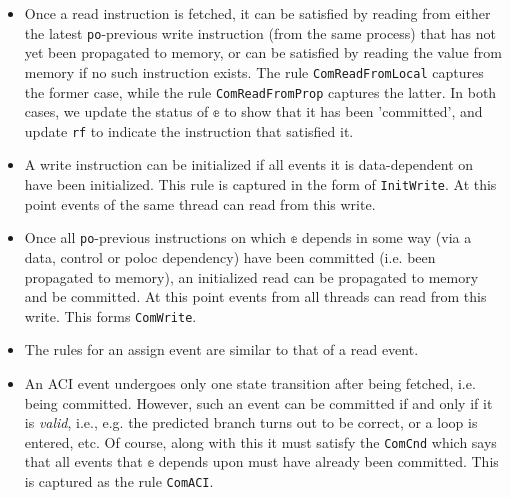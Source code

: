 \documentclass{article}
\begin{document}
\begin{itemize}
    \setlength\itemsep{0em}
    \item Once a read instruction is fetched, it can be satisfied by reading from either the latest \texttt{po}-previous write instruction (from the same process) that has not yet been propagated to memory, or can be satisfied by reading the value from memory if no such instruction exists. The rule \texttt{ComReadFromLocal} captures the former case, while the rule \texttt{ComReadFromProp} captures the latter. In both cases, we update the status of $\mathbb{e}$ to show that it has been 'committed', and update \texttt{rf} to indicate the instruction that satisfied it.
    \item A write instruction can be initialized if all events it is data-dependent on have been initialized. This rule is captured in the form of \texttt{InitWrite}. At this point events of the same thread can read from this write.
    \item  Once all \texttt{po}-previous instructions on which $\mathbb{e}$ depends in some way (via a data, control or poloc dependency) have been committed (i.e. been propagated to memory), an initialized read can be propagated to memory and be committed. At this point events from all threads can read from this write. This forms \texttt{ComWrite}.
    \item The rules for an assign event are similar to that of a read event.
    \item An ACI event undergoes only one state transition after being fetched, i.e. being committed. However, such an event can be committed if and only if it is \textit{valid}, i.e., e.g. the predicted branch turns out to be correct, or a loop is entered, etc. Of course, along with this it must satisfy the \texttt{ComCnd} which says that all events that $\mathbb{e}$ depends upon must have already been committed. This is captured as the rule \texttt{ComACI}.
\end{itemize}
\vspace{-2em}
\end{document}
